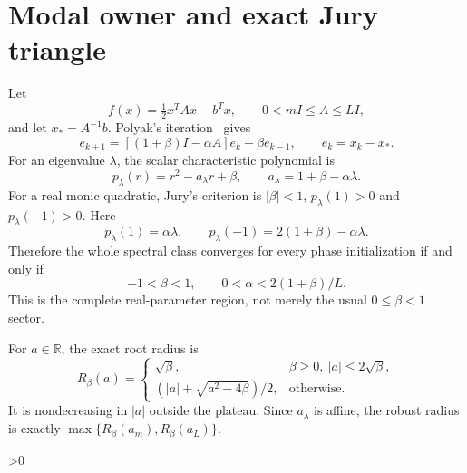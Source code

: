 \documentclass[9pt]{extarticle}
\begin{document}
\section{Modal owner and exact Jury triangle}
Let
\[
 f(x)=\tfrac12x^TAx-b^Tx,\qquad 0<mI\le A\le LI,
\]
and let $x_*=A^{-1}b$.  Polyak's iteration~\cite{P64} gives
\begin{equation}\label{eq:hb}
 e_{k+1}=[(1+\beta)I-\alpha A]e_k-\beta e_{k-1},
 \qquad e_k=x_k-x_* .
\end{equation}
For an eigenvalue $\lambda$, the scalar characteristic polynomial is
\begin{equation}\label{eq:p}
 p_\lambda(r)=r^2-a_\lambda r+\beta,\qquad
 a_\lambda=1+\beta-\alpha\lambda.
\end{equation}
For a real monic quadratic, Jury's criterion is
$|\beta|<1$, $p_\lambda(1)>0$ and $p_\lambda(-1)>0$.  Here
\[
 p_\lambda(1)=\alpha\lambda,\qquad
 p_\lambda(-1)=2(1+\beta)-\alpha\lambda.
\]
Therefore the whole spectral class converges for every phase initialization
if and only if
\begin{equation}\label{eq:triangle}
 \boxed{-1<\beta<1,\qquad 0<\alpha<2(1+\beta)/L.}
\end{equation}
This is the complete real-parameter region, not merely the usual
$0\le\beta<1$ sector.

For $a\in\mathbb R$, the exact root radius is
\begin{equation}\label{eq:radius}
 R_\beta(a)=
 \begin{cases}
 \sqrt\beta,&\beta\ge0,\ |a|\le2\sqrt\beta,\\
 (|a|+\sqrt{a^2-4\beta})/2,&\text{otherwise}.
 \end{cases}
\end{equation}
It is nondecreasing in $|a|$ outside the plateau.  Since $a_\lambda$ is affine,
the robust radius is exactly
$\max\{R_\beta(a_m),R_\beta(a_L)\}$.

\ifnum\CRevisionRound>0
\end{document}
